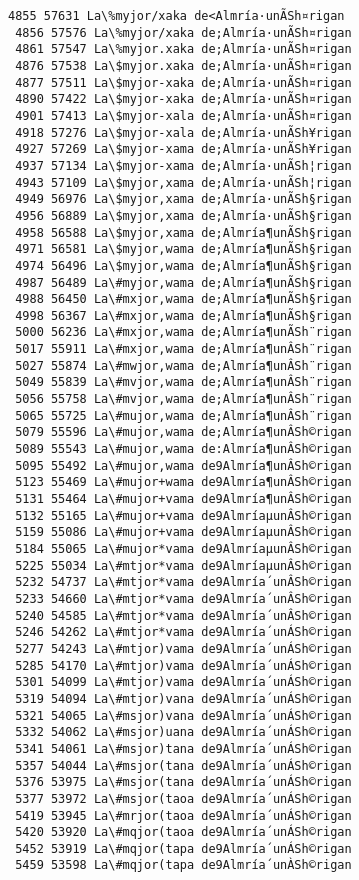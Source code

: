 \documentclass[11pt]{article}
\begin{document}
\begin{Verbatim}[commandchars=\\\{\}]
 4855 57631 La\%myjor/xaka de<Almría·unÃSh¤rigan
 4856 57576 La\%myjor/xaka de;Almría·unÃSh¤rigan
 4861 57547 La\%myjor.xaka de;Almría·unÃSh¤rigan
 4876 57538 La\$myjor.xaka de;Almría·unÃSh¤rigan
 4877 57511 La\$myjor-xaka de;Almría·unÃSh¤rigan
 4890 57422 La\$myjor-xaka de;Almría·unÃSh¤rigan
 4901 57413 La\$myjor-xala de;Almría·unÃSh¤rigan
 4918 57276 La\$myjor-xala de;Almría·unÃSh¥rigan
 4927 57269 La\$myjor-xama de;Almría·unÃSh¥rigan
 4937 57134 La\$myjor-xama de;Almría·unÃSh¦rigan
 4943 57109 La\$myjor,xama de;Almría·unÃSh¦rigan
 4949 56976 La\$myjor,xama de;Almría·unÃSh§rigan
 4956 56889 La\$myjor,xama de;Almría·unÃSh§rigan
 4958 56588 La\$myjor,xama de;Almría¶unÃSh§rigan
 4971 56581 La\$myjor,wama de;Almría¶unÃSh§rigan
 4974 56496 La\$myjor,wama de;Almría¶unÃSh§rigan
 4987 56489 La\#myjor,wama de;Almría¶unÃSh§rigan
 4988 56450 La\#mxjor,wama de;Almría¶unÃSh§rigan
 4998 56367 La\#mxjor,wama de;Almría¶unÃSh§rigan
 5000 56236 La\#mxjor,wama de;Almría¶unÃSh¨rigan
 5017 55911 La\#mxjor,wama de;Almría¶unÂSh¨rigan
 5027 55874 La\#mwjor,wama de;Almría¶unÂSh¨rigan
 5049 55839 La\#mvjor,wama de;Almría¶unÂSh¨rigan
 5056 55758 La\#mvjor,wama de;Almría¶unÂSh¨rigan
 5065 55725 La\#mujor,wama de;Almría¶unÂSh¨rigan
 5079 55596 La\#mujor,wama de;Almría¶unÂSh©rigan
 5089 55543 La\#mujor,wama de:Almría¶unÂSh©rigan
 5095 55492 La\#mujor,wama de9Almría¶unÂSh©rigan
 5123 55469 La\#mujor+wama de9Almría¶unÂSh©rigan
 5131 55464 La\#mujor+vama de9Almría¶unÂSh©rigan
 5132 55165 La\#mujor+vama de9AlmríaµunÂSh©rigan
 5159 55086 La\#mujor+vama de9AlmríaµunÂSh©rigan
 5184 55065 La\#mujor*vama de9AlmríaµunÂSh©rigan
 5225 55034 La\#mtjor*vama de9AlmríaµunÂSh©rigan
 5232 54737 La\#mtjor*vama de9Almría´unÂSh©rigan
 5233 54660 La\#mtjor*vama de9Almría´unÂSh©rigan
 5240 54585 La\#mtjor*vama de9Almría´unÂSh©rigan
 5246 54262 La\#mtjor*vama de9Almría´unÁSh©rigan
 5277 54243 La\#mtjor)vama de9Almría´unÁSh©rigan
 5285 54170 La\#mtjor)vama de9Almría´unÁSh©rigan
 5301 54099 La\#mtjor)vama de9Almría´unÁSh©rigan
 5319 54094 La\#mtjor)vana de9Almría´unÁSh©rigan
 5321 54065 La\#msjor)vana de9Almría´unÁSh©rigan
 5332 54062 La\#msjor)uana de9Almría´unÁSh©rigan
 5341 54061 La\#msjor)tana de9Almría´unÁSh©rigan
 5357 54044 La\#msjor(tana de9Almría´unÁSh©rigan
 5376 53975 La\#msjor(tana de9Almría´unÁSh©rigan
 5377 53972 La\#msjor(taoa de9Almría´unÁSh©rigan
 5419 53945 La\#mrjor(taoa de9Almría´unÁSh©rigan
 5420 53920 La\#mqjor(taoa de9Almría´unÁSh©rigan
 5452 53919 La\#mqjor(tapa de9Almría´unÁSh©rigan
 5459 53598 La\#mqjor(tapa de9Almría´unÀSh©rigan

\end{Verbatim}
\end{document}
